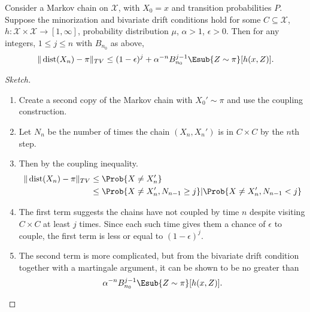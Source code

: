 \documentclass[12pt]{article}
\begin{document}
\begin{theorem}
    Consider a Markov chain on \( \mathcal{X} \), with \( X_0 = x \) and
    transition probabilities \( P \).  Suppose the minorization and
    bivariate drift conditions hold for some \( C \subseteq \mathcal{X} \),
    \( h :  \mathcal{X} \times \mathcal{X} \to [1, \infty] \),
    probability distribution \( \mu \), \( \alpha > 1 \), \( \epsilon >0
    \).  Then for any integers, \( 1 \le j \le n \) with \( B_{n_0} \)
    as above,
    \[
        \|
        \operatorname{dist}
        (X_n) - \pi \|_{TV} \le (1-\epsilon)^j + \alpha^{-n} B_{n_0}^{j-1}
        \Esub{Z \sim \pi}[h(x,Z)].
    \]

\end{theorem}

\begin{proof}[Sketch]
    \begin{enumerate}
        \item
            Create a second copy of the Markov chain with \( X_0' \sim
            \pi \) and use the coupling construction.
        \item
            Let \( N_n \) be the number of times the chain \( (X_n, X_n')
            \) is in \( C \times C \) by the \( n \)th step.
        \item
            Then by the coupling inequality.
            \begin{align*}
                \|
                \operatorname{dist}
                (X_n) - \pi \|_{TV} &\le \Prob{X \ne X_n'} \\
                &\le \Prob{X \ne X_n', N_{n-1} \ge j} | \Prob{X \ne X_n',
                N_{n-1} <j}
            \end{align*}
        \item
            The first term suggests the chains have not coupled by time \(
            n \) despite visiting \( C \times C \) at least \( j \)
            times.  Since each such time gives them a chance of \(
            \epsilon \) to couple, the first term is less or equal to \(
            (1 - \epsilon)^j \).
        \item
            The second term is more complicated, but from the bivariate
            drift condition together with a martingale argument, it can
            be shown to be no greater than
            \[
                \alpha^{-n} B_{n_0}^{j-1} \Esub{Z \sim \pi}[h(x,Z)].
            \]
    \end{enumerate}
\end{proof}
\end{document}
